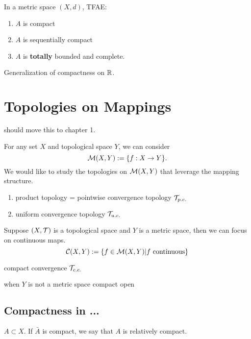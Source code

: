 \begin{definition}
    
\end{definition}

\begin{theorem}
    In a metric space $(X,d)$, TFAE:
    \begin{enumerate}[label=(\roman*)]
        \item $A$ is compact
        \item $A$ is sequentially compact
        \item $A$ is \textbf{totally} bounded and complete.
    \end{enumerate}
\end{theorem}
\begin{remark}
    Generalization of compactness on $\mathbb{R}$.
\end{remark}



\section{Topologies on Mappings}
should move this to chapter 1.

For any set $X$ and topological space $Y$, we can consider 
$$
\mathcal{M}(X,Y):=\{f:X\to Y\}.
$$
We would like to study the topologies on $\mathcal{M}(X,Y)$ that leverage the mapping structure.

\begin{enumerate}[label=(\roman*)]
    \item product topology = pointwise convergence topology $\mathcal{T}_{p.c.}$
    \item uniform convergence topology $\mathcal{T}_{u.c.}$
\end{enumerate}

Suppose $(X,\mathcal{T})$ is a topological space and $Y$ is a metric space, then we can focus on continuous maps.
$$
\mathcal{C}(X,Y):=\{f\in \mathcal{M}(X,Y)|f\text{ continuous}\}
$$

compact convergence $\mathcal{T}_{c.c.}$

when $Y$ is not a metric space
compact open

\subsection{Compactness in ...}

\begin{definition}
    $A\subset X$. If $\bar{A}$ is compact, we say that $A$ is relatively compact.
\end{definition}

